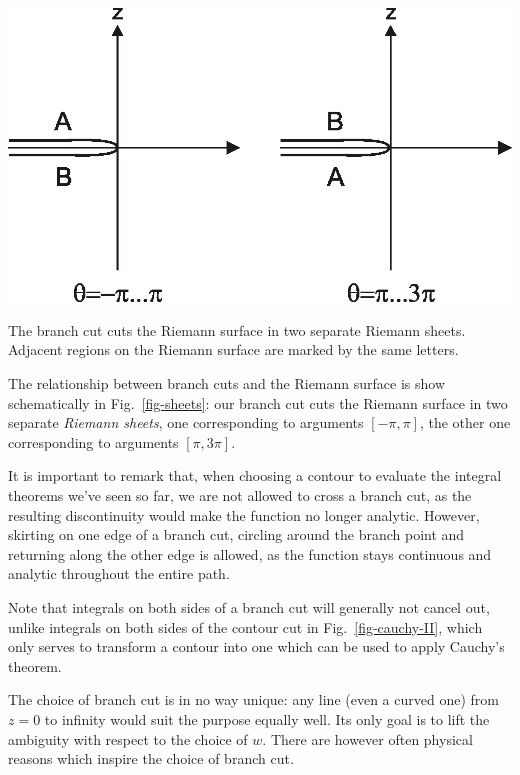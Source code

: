 \begin{marginfigure}[1cm]
\centering
\includegraphics{complex/figures/sheets}
\caption{The branch cut cuts the Riemann surface in two separate Riemann sheets.
Adjacent regions on the Riemann surface are marked by the same letters.}
\label{fig-sheets}
\end{marginfigure}

The relationship between branch cuts and the Riemann surface is show schematically in Fig.~\ref{fig-sheets}: our branch cut cuts the Riemann surface in two separate \emph{Riemann sheets}, one corresponding to arguments $[-\pi, \pi]$, the other one corresponding to arguments $[\pi,3 \pi]$.

It is important to remark that, when choosing a contour to evaluate the integral theorems we've seen so far, we are not allowed to cross a branch cut, as the resulting discontinuity would make the function no longer analytic. However, skirting on one edge of a branch cut, circling around the branch point and returning along the other edge is allowed, as the function stays continuous and analytic throughout the entire path. 

Note that integrals on both sides of a branch cut will generally not cancel out, unlike integrals on both sides of the contour cut in Fig.~\ref{fig-cauchy-II}, which only serves to transform a contour into one which can be used to apply Cauchy's theorem.

The choice of branch cut is in no way unique: any line (even a curved one) from $z=0$ to infinity would suit the purpose equally well. Its only goal is to lift the ambiguity with respect to the choice of $w$. There are however often physical reasons which inspire the choice of branch cut.

\pagebreak


